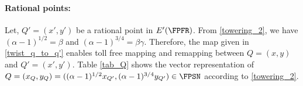 \paragraph{\bf{Rational points: }} 
Let, $Q'=(x',y')$ be a rational point in $E'(\FPFR)$. 
From \eqref{towering_2}, we have  $(\alpha-1)^{1/2}=\beta$ and $(\alpha-1)^{3/4}=\beta\gamma$.
Therefore, the map given in  \eqref{twist_q_to_q'} enables toll free mapping and remapping between $Q=(x,y)$ and $Q'=(x',y')$.
Table \ref{tab_Q} shows the vector representation of $Q = (x_{Q},y_Q) = ((\alpha-1)^{1/2}x_{Q'},(\alpha-1)^{3/4}y_{Q'}) \in \FPSN$ according to \eqref{towering_2}. 
\renewcommand{\baselinestretch}{1.5}
\begin{table}[!h]
	\centering
		\caption{Vector representation of $Q = (x_Q,y_Q) \in \g2 \subset E(\mathbb{F}_{p^{16}})$.}
		\label{tab_Q}
\end{table}

